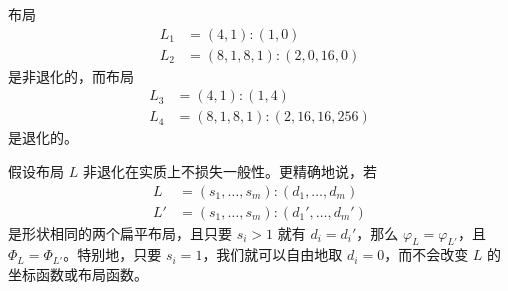 \begin{example}
    布局
    \begin{align*}
        L_1 & = (4,1):(1,0)\\
        L_2 & = (8,1,8,1):(2,0,16,0)
    \end{align*}
    是非退化的，而布局
    \begin{align*}
        L_3 & = (4,1):(1,4)\\
        L_4 & = (8,1,8,1):(2,16,16,256)
    \end{align*}
    是退化的。
\end{example}

\begin{observation}
假设布局 $L$ 非退化在实质上不损失一般性。更精确地说，若
\begin{align*}
    L & = (s_1,\dots,s_m):(d_1,\dots,d_m)\\
    L' & = (s_1,\dots,s_m):(d_1',\dots,d_m')
\end{align*}
是形状相同的两个扁平布局，且只要 $s_i >1$ 就有 $d_i = d_i'$，那么 $\varphi_L = \varphi_{L'}$，且 $\Phi_{L} = \Phi_{L'}$。特别地，只要 $s_i = 1$，我们就可以自由地取 $d_i = 0$，而不会改变 $L$ 的坐标函数或布局函数。
\end{observation}



